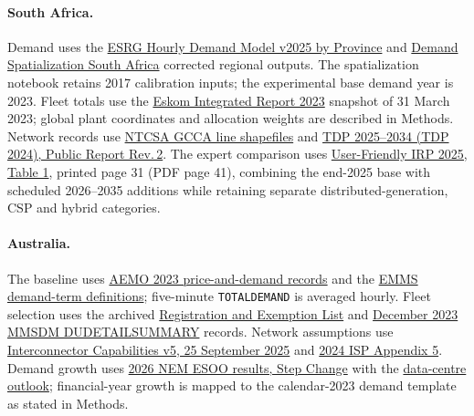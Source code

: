 \documentclass[pdflatex,sn-nature]{sn-jnl}
\begin{document}
\begin{appendices}
\paragraph{South Africa.} Demand uses the \href{https://doi.org/10.25375/uct.26942134}{ESRG Hourly Demand Model v2025 by Province} and \href{https://github.com/GregoryIreland/Demand-Spatialization-South-Africa}{Demand Spatialization South Africa} corrected regional outputs. The spatialization notebook retains 2017 calibration inputs; the experimental base demand year is 2023. Fleet totals use the \href{https://www.eskom.co.za/heritage/wp-content/uploads/2024/03/2023_Annual_Report.pdf}{Eskom Integrated Report 2023} snapshot of 31 March 2023; global plant coordinates and allocation weights are described in Methods. Network records use \href{https://www.ntcsa.co.za/wp-content/uploads/2024/06/Shapefiles-1.zip}{NTCSA GCCA line shapefiles} and \href{https://www.ntcsa.co.za/wp-content/uploads/2025/02/TDP-2024-Public-Report_Rev2.pdf}{TDP 2025--2034 (TDP 2024), Public Report Rev.\,2}. The expert comparison uses \href{https://www.dee.gov.za/wp-content/uploads/2026/08/User-Friendly-IRP-2025.pdf}{User-Friendly IRP 2025, Table 1}, printed page 31 (PDF page 41), combining the end-2025 base with scheduled 2026--2035 additions while retaining separate distributed-generation, CSP and hybrid categories.

\paragraph{Australia.} The baseline uses \href{https://aemo.com.au/energy-systems/electricity/national-electricity-market-nem/data-nem/aggregated-data}{AEMO 2023 price-and-demand records} and the \href{https://www.aemo.com.au/-/media/files/electricity/nem/security_and_reliability/dispatch/policy_and_process/demand-terms-in-emms-data-model.pdf}{EMMS demand-term definitions}; five-minute \texttt{TOTALDEMAND} is averaged hourly. Fleet selection uses the archived \href{https://aemo.com.au/-/media/files/electricity/nem/participant_information/nem-registration-and-exemption-list.xlsx}{Registration and Exemption List} and \href{https://nemweb.com.au/Data_Archive/Wholesale_Electricity/MMSDM/2023/MMSDM_2023_12/MMSDM_Historical_Data_SQLLoader/DATA/PUBLIC_DVD_DUDETAILSUMMARY_202312010000.zip}{December 2023 MMSDM DUDETAILSUMMARY} records. Network assumptions use \href{https://www.aemo.com.au/-/media/files/electricity/nem/security_and_reliability/congestion-information/2024/interconnector-capabilities.pdf}{Interconnector Capabilities v5, 25 September 2025} and \href{https://www.aemo.com.au/-/media/files/major-publications/isp/2024/appendices/a5-network-investments.pdf}{2024 ISP Appendix 5}. Demand growth uses \href{https://www.aemo.com.au/-/media/files/electricity/nem/planning_and_forecasting/nem_esoo/2026/2026-esoo-results-workbook.xlsx}{2026 NEM ESOO results, Step Change} with the \href{https://www.aemo.com.au/-/media/files/electricity/nem/planning_and_forecasting/nem_esoo/2026/2026-esoo-data-centre-forecasting-overview.pdf}{data-centre outlook}; financial-year growth is mapped to the calendar-2023 demand template as stated in Methods.


\end{appendices}
\end{document}
